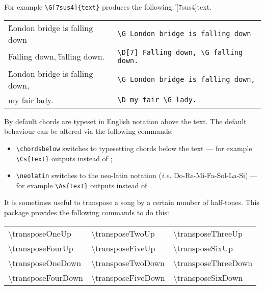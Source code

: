 \documentclass[green,a4paper,oneside,openany,noparindent,noparskip,article,nomatter]{bookest}
\begin{document}
For example \texttt{\textbackslash G[7sus4]\{text\}} produces the following: \G[7sus4]{text}.


\begin{tabular}{p{6cm}l}
\G London bridge is falling down &\texttt{\textbackslash G London bridge is falling down}\\

\D[7] Falling down, \G falling down. &\texttt{\textbackslash D[7] Falling down, \textbackslash G falling down.}\\

\G London bridge is falling down, &\texttt{\textbackslash G London bridge is falling down,}\\

\D my fair \G lady. &\texttt{\textbackslash D my fair \textbackslash G lady.}
\end{tabular}

\label{notations}

By default chords are typeset in English notation above the text. The default behaviour can be altered via the following commands:

\begin{itemize}
	\item \texttt{\textbackslash chordsbelow} switches to typesetting chords below the text --- for example \texttt{\textbackslash Cs\{text\}} outputs {\chordsbelow {}} instead of ;
	\item \texttt{\textbackslash neolatin} switches to the neo-latin notation (\emph{i.e.} Do-Re-Mi-Fa-Sol-La-Si)  --- for example \texttt{\textbackslash As\{text\}} outputs {\neolatin {}} instead of .
\end{itemize}



\label{opts}

It is sometimes useful to transpose a song by a certain number of half-tones. This package provides the following commands to do this:

\begin{center}\ttfamily
\begin{tabular}{p{4cm}p{4cm}p{4cm}}

\textbackslash transposeOneUp &\textbackslash transposeTwoUp &\textbackslash transposeThreeUp\\

\textbackslash transposeFourUp &\textbackslash transposeFiveUp &\textbackslash transposeSixUp\\

\textbackslash transposeOneDown &\textbackslash transposeTwoDown &\textbackslash transposeThreeDown\\

\textbackslash transposeFourDown &\textbackslash transposeFiveDown &\textbackslash transposeSixDown
\end{tabular}
\end{center}
\end{document}
